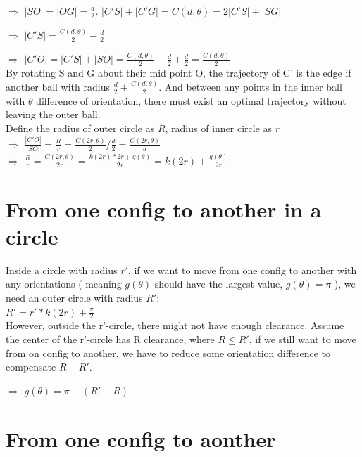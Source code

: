 \documentclass[12pt]{article}
\begin{document}
  $\Longrightarrow$ $|SO| = |OG| = \frac{d}{2}$. $|C'S| + |C'G| = C( d, \theta ) = 2|C'S| + |SG|$
  
  $\Longrightarrow$ $|C'S| = \frac{C( d, \theta )}{2} - \frac{d}{2}$

  $\Longrightarrow$ $|C'O| = |C'S|+|SO| = \frac{C( d, \theta )}{2} - \frac{d}{2} + \frac{d}{2} = \frac{C( d, \theta )}{2}$\\

  By rotating S and G about their mid point O, the trajectory of C' is the edge if another ball with radius $\frac{d}{2} + \frac{C( d, \theta )}{2}$. And between any points in the inner ball with $\theta$ difference of orientation, there must exist an optimal trajectory without leaving the outer ball. \\

  Define the radius of outer circle as $R$, radius of inner circle as $r$\\

  $\Longrightarrow$ $\frac{|C'O|}{|SO|} = \frac{R}{r} = \frac{C(2r,\theta)}{2} / \frac{d}{2} = \frac{C(2r,\theta)}{d}$\\

  $\Longrightarrow$ $\frac{R}{r} = \frac{C(2r,\theta)}{2r} = \frac{k(2r)*2r + g(\theta)}{2r} = k(2r) + \frac{g(\theta)}{2r}$\\

  \section{From one config to another in a circle}

  Inside a circle with radius $r'$, if we want to move from one config to another with any orientations ( meaning $g(\theta)$ should have the largest value, $g(\theta) = \pi$ ), we need an outer circle with radius $R'$:\\

  $R' = r' * k(2r) + \frac{\pi}{2}$\\

  However, outside the r'-circle, there might not have enough clearance. Assume the center of the r'-circle has R clearance, where $R \leq R' $, if we still want to move from on config to another, we have to reduce some orientation difference to compensate $R-R'$.

  $\Longrightarrow$ $g(\theta) = \pi - (R'-R)$ \\

  \section{From one config to aonther}
\end{document}
